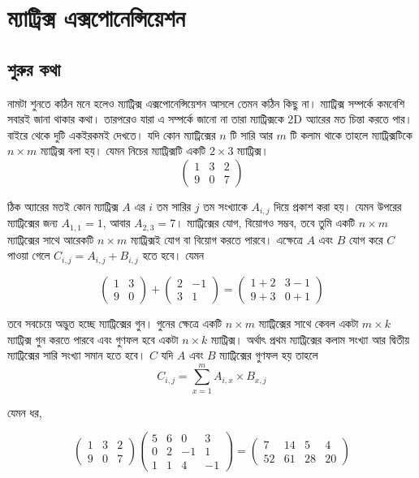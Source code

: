 \chapter{ম্যাট্রিক্স এক্সপোনেন্সিয়েশন}

\section{শুরুর কথা}

নামটা শুনতে কঠিন মনে হলেও ম্যাট্রিক্স এক্সপোনেন্সিয়েশন আসলে তেমন কঠিন কিছু না। ম্যাট্রিক্স সম্পর্কে কমবেশি সবারই জানা থাকার কথা। তারপরেও যারা এ সম্পর্কে জানো না তারা ম্যাট্রিক্সকে 2D অ্যারের মত চিন্তা করতে পার। বাইরে থেকে দুটি একইরকমই দেখতে। যদি কোন ম্যাট্রিক্সের $n$ টি সারি আর $m$ টি কলাম থাকে তাহলে ম্যাট্রিক্সটিকে $n \times m$ ম্যাট্রিক্স বলা হয়। যেমন নিচের ম্যাট্রিক্সটি একটি $2 \times 3$ ম্যাট্রিক্স।
$$
\begin{pmatrix}
1 & 3 & 2\\
9 & 0 & 7
\end{pmatrix}
$$

ঠিক অ্যারের মতই কোন ম্যাট্রিক্স $A$ এর $i$ তম সারির $j$ তম সংখ্যাকে $A_{i, j}$ দিয়ে প্রকাশ করা হয়। যেমন উপরের ম্যাট্রিক্সের জন্য $A_{1, 1} = 1$, আবার $A_{2, 3} = 7$। ম্যাট্রিক্সের যোগ, বিয়োগও সম্ভব, তবে তুমি একটি $n \times m$ ম্যাট্রিক্সের সাথে আরেকটি $n \times m$ ম্যাট্রিক্সই যোগ বা বিয়োগ করতে পারবে। এক্ষেত্রে $A$ এবং  $B$ যোগ করে $C$ পাওয়া গেলে $C_{i, j} = A_{i, j} + B_{i, j}$ হতে হবে। যেমন

$$
\begin{pmatrix}
1 & 3\\
9 & 0
\end{pmatrix}
+ 
\begin{pmatrix}
2 & -1\\
3 & 1
\end{pmatrix}
=
\begin{pmatrix}
1 + 2 & 3 - 1\\
9 + 3 & 0 + 1
\end{pmatrix}
$$

তবে সবচেয়ে অদ্ভুত হচ্ছে ম্যাট্রিক্সের গুন। গুনের ক্ষেত্রে একটি $n \times m$ ম্যাট্রিক্সের সাথে কেবল একটা $m \times k$ ম্যাট্রিক্স গুন করতে পারবে এবং  গুণফল হবে একটা $n \times k$ ম্যাট্রিক্স। অর্থাৎ প্রথম ম্যাট্রিক্সের কলাম সংখ্যা আর দ্বিতীয় ম্যাট্রিক্সের সারি সংখ্যা সমান হতে হবে। $C$ যদি $A$ এবং $B$ ম্যাট্রিক্সের গুণফল হয় তাহলে 
$$ C_{i, j} = \sum_{x = 1}^{m} A_{i, x} \times B_{x, j}$$

যেমন ধর, 

$$
\begin{pmatrix}
1 & 3 & 2\\
9 & 0 & 7
\end{pmatrix}
\begin{pmatrix}
5 & 6 & 0 & 3 \\
0 & 2 & -1 & 1\\
1 & 1 & 4 & -1
\end{pmatrix} = 
\begin{pmatrix}
7 & 14 & 5 & 4 \\
52 & 61 & 28 & 20
\end{pmatrix}
$$

